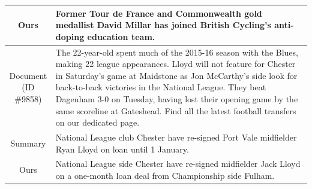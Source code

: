 \begin{table}[bth!]
\begin{tabular}{c|p{}}
  Ours & Former Tour de France and Commonwealth gold medallist David Millar has joined British Cycling's anti-doping education team. \\\hline
  \makecell{Document\\(ID \#9858)} & The 22-year-old spent much of the 2015-16 season with the Blues, making 22 league appearances. Lloyd will not feature for Chester in Saturday's game at Maidstone as Jon McCarthy's side look for back-to-back victories in the National League. They beat Dagenham 3-0 on Tuesday, having lost their opening game by the same scoreline at Gateshead. Find all the latest football transfers on our dedicated page. \\ \hline
  Summary & National League club Chester have re-signed Port Vale midfielder Ryan Lloyd on loan until 1 January. \\ \hline
  Ours & National League side Chester have re-signed midfielder Jack Lloyd on a one-month loan deal from Championship side Fulham. \\ \hline
  

\end{tabular}
\end{table}
